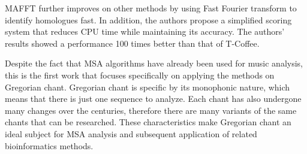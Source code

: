 MAFFT \citep{mafft} further improves on other methods by using Fast Fourier transform to identify homologues fast. In addition, the authors
propose a simplified scoring system that reduces CPU time while maintaining its accuracy. The authors' results showed a performance 
100 times better than that of T-Coffee. 

Despite the fact that MSA algorithms have already been used for music analysis, this is the first work that focuses specifically on applying
the methods on Gregorian chant. Gregorian chant is specific by its monophonic nature, which means that there is just one sequence to analyze.
Each chant has also undergone many changes over the centuries, therefore there are many variants of the same chants that can be
researched. These characteristics make Gregorian chant an ideal subject for MSA analysis and subsequent application of related bioinformatics methods.

